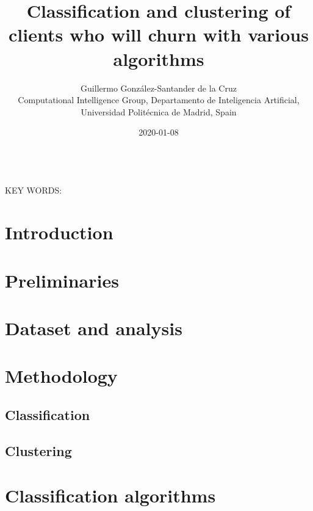 \documentclass[a4paper,11pt]{article}
\begin{document}
\title{Classification and clustering of clients who will churn with various algorithms}

\author{{Guillermo González-Santander de la Cruz}\\
{\small Computational Intelligence Group, Departamento de Inteligencia Artificial, Universidad Politécnica de Madrid, Spain}}

\date{2020-01-08}
\maketitle



\begin{abstract}
\end{abstract}


\ \\
KEY WORDS:




\section{Introduction}

\section{Preliminaries}

\section{Dataset and analysis}

\section{Methodology}

\subsection{Classification}

\subsection{Clustering}

\section{Classification algorithms}
\end{document}
